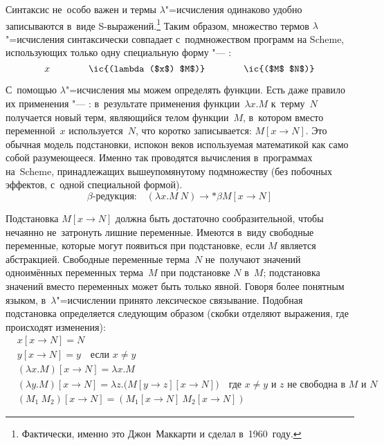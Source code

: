 Синтаксис не~особо важен и термы $\lambda$"=исчисления одинаково удобно
записываются в~виде S-выражений.\footnote*{Фактически, именно это Джон~Маккарти
и сделал в~1960~году.} Таким образом, множество термов $\lambda$"=исчисления
синтаксически совпадает с~подмножеством программ на Scheme, использующих только
одну специальную форму "--- :
%
\[
x \qquad\qquad \text{\ic{(lambda ($x$) $M$)}} \qquad\qquad \text{\ic{($M$ $N$)}}
\]

С~помощью $\lambda$"=исчисления мы можем определять функции. Есть даже правило
их применения "--- : в~результате применения
функции~$\lambda x . M$ к~терму~$N$ получается новый терм, являющийся телом
функции~$M$\!, в~котором вместо переменной~$x$ используется~$N$\!, что коротко
записывается: $M[x \to N]$. Это обычная модель подстановки, испокон веков
используемая математикой как само собой разумеющееся. Именно так проводятся
вычисления в~программах на~Scheme, принадлежащих вышеупомянутому подмножеству
(без побочных эффектов, с~одной специальной формой).
%
\[ \text{$\beta$-редукция:} \quad (\lambda x . M\ N) \to*{\beta} M[x \to N] \]

Подстановка $M[x \to N]$ должна быть достаточно сообразительной, чтобы нечаянно
не~затронуть лишние переменные. Имеются в~виду свободные переменные, которые
могут появиться при подстановке, если $M$ является абстракцией. Свободные
переменные терма~$N$ не~получают значений одноимённых переменных терма~$M$ при
подстановке $N$ в~$M$; подстановка значений вместо переменных может быть только
явной. Говоря более понятным языком, в~$\lambda$"=исчислении принято лексическое
связывание. Подобная подстановка определяется следующим образом (скобки отделяют
выражения, где происходят изменения):
%
\begin{align*}
  &  x[x \to N] = N \\
  &  y[x \to N] = y \quad \text{если $x \ne y$}                               \\
  &  (\lambda x . M)[x \to N] = \lambda x . M                                 \\
  &  (\lambda y . M)[x \to N] = \lambda z . \big(M[y \to z][x \to N]\big)
         \quad \text{где $x \ne y$ и $z$ не~свободна в~$M$ и~$N$}             \\
  &  (M_1\ M_2)[x \to N] = (M_1[x \to N]\ M_2[x \to N])
\end{align*}

